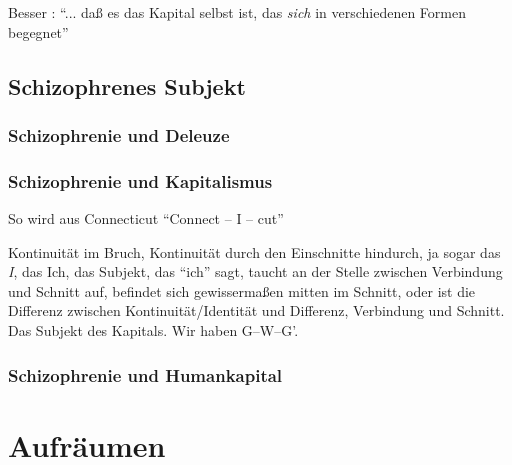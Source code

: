 \documentclass[12pt,
               DIV13,
               paper=a4,
               twoside=false,
               onehalfspacing,
               bibliography=totoc,
               toc=graduated,
               draft,
               ]{scrartcl}
\newcommand{\pc}[2]{\parencite[#1]{#2}}
\newcommand{\worries}[1]{\ifdraft{\textcolor{blue}{\texttt{(#1)}}}{}}
\newcommand{\gwg}{G--W--G'\xspace}
\begin{document}
Besser \worries{?}: "`... daß es das Kapital selbst ist, das
\emph{sich} in verschiedenen Formen begegnet"'

\subsection{Schizophrenes Subjekt}

\subsubsection{Schizophrenie und Deleuze}

\subsubsection{Schizophrenie und Kapitalismus}

So wird aus Connecticut "`Connect -- I -- cut"' \pc{48}{ao}

Kontinuität im Bruch, Kontinuität durch den Einschnitte hindurch, ja
sogar das \emph{I}, das Ich, das Subjekt, das "`ich"' sagt, taucht an
der Stelle zwischen Verbindung und Schnitt auf, befindet sich
gewissermaßen mitten im Schnitt, oder ist die Differenz zwischen
Kontinuität/Identität und Differenz, Verbindung und Schnitt. Das
Subjekt des Kapitals. Wir haben \gwg.

\subsubsection{Schizophrenie und Humankapital}

\section{Aufräumen}

\newpage
\nocite{*}
\printshorthands
\printbibliography
\end{document}
